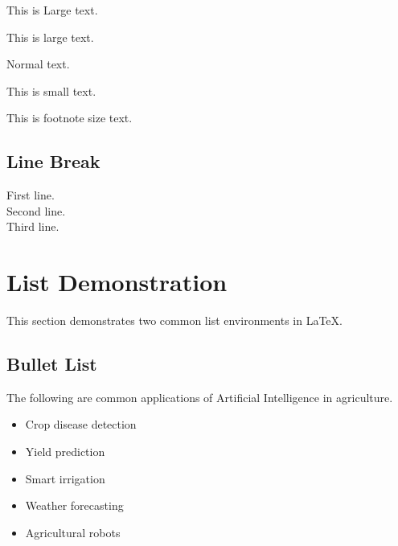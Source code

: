 \documentclass[pdflatex,sn-mathphys-num]{sn-jnl}%
\theoremstyle{thmstyleone}%
\theoremstyle{thmstyletwo}%
\theoremstyle{thmstylethree}%
\begin{document}
{\Large This is Large text.}

\vspace{0.2cm}

{\large This is large text.}

\vspace{0.2cm}

Normal text.

\vspace{0.2cm}

{\small This is small text.}

\vspace{0.2cm}

{\footnotesize This is footnote size text.}

\subsection{Line Break}

First line.\\
Second line.\\
Third line.


\section{List Demonstration}

This section demonstrates two common list environments in LaTeX.

\subsection{Bullet List}

The following are common applications of Artificial Intelligence in agriculture.

\begin{itemize}

\item Crop disease detection

\item Yield prediction

\item Smart irrigation

\item Weather forecasting

\item Agricultural robots

\end{itemize}
\end{document}
